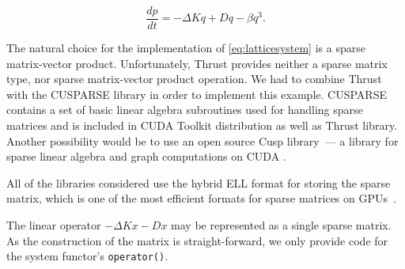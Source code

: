 \documentclass[1p]{elsarticle}
\newcommand{\code}[1]{\lstinline|#1|}
\newcommand {\de} {\mbox{d}}
\newcommand {\rem}[1]{}
\begin{document}
\rem{
Another example for our performance and usage study is a strongly
nonlinear disordered Hamiltonian lattice. Its equations of motion are
governed by
\begin{equation}
\frac{\de q_{i,j}}{\de t} = p_{i,j} \quad \text{,} \quad \quad \frac{\de
p_{i,j}}{\de t} = - \omega_{i,j}^2 q_i - \beta q_{i,j}^3 + \Delta_d q_{i,j}
\,\,\text{.}
\label{eq:disordered_ham}
\end{equation}
Here, $\Delta_d q_{i,j}$ denotes the two-dimensional discreet Laplacian
$\Delta_d
q_{i,j}=q_{i+1,j}+q_{i-1,j}+q_{i,j+1}+q_{i,j-1}-4q_{i,j}$. Such
systems are widely used in theoretical physics to study phenomena
like Anderson localization or thermalization.

An important property of \eqref{eq:disordered_ham} is its Hamiltonian
nature. It can be obtained from a Hamiltonian and the energy and phase
volume is conserved during its evolution. To account for these
properties, a special class of solvers exists, namely symplectic
solvers. Odeint implements three different variants of such solvers,
all are of the Runge-Kutta-Nystrom type.
}

\begin{equation} \label{eq:latticesystem}
    \frac{dp}{dt} = -\Delta Kq + Dq - \beta q^3.
\end{equation}

The natural choice for the implementation of \eqref{eq:latticesystem} is a
sparse matrix-vector product. Unfortunately, Thrust provides neither a sparse
matrix type, nor sparse matrix-vector product operation.  We had to combine
Thrust with the CUSPARSE library in order to implement this example. CUSPARSE
contains a set of basic linear algebra subroutines used for handling sparse
matrices and is included in CUDA Toolkit distribution as well as Thrust
library. Another possibility would be to use an open source Cusp library~--- a
library for sparse linear algebra and graph computations on CUDA
\cite{CuspRef}.

All of the libraries considered use the hybrid
ELL format for storing the sparse matrix, which is one of the most efficient formats for sparse matrices on
GPUs~\cite{BellGarland2008}.

The linear operator $-\Delta Kx-Dx$ may be represented as a single sparse matrix.
As the construction of the matrix is straight-forward, we only provide code for the system functor's \code{operator()}.
\end{document}
